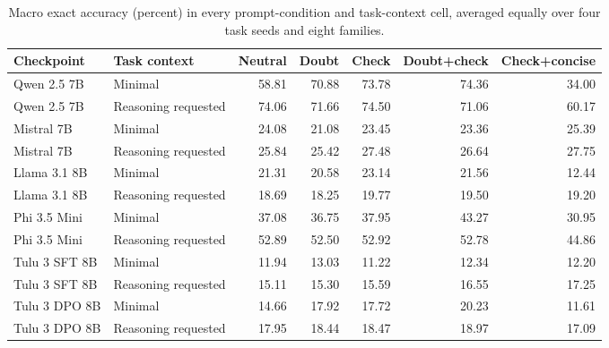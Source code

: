 \begin{table}[t]
\centering\scriptsize
\caption{Macro exact accuracy (percent) in every prompt-condition and task-context cell, averaged equally over four task seeds and eight families.}
\label{tab:condition-accuracy}
\begin{tabular}{@{}llrrrrr@{}}
\toprule
Checkpoint & Task context & Neutral & Doubt & Check & Doubt+check & Check+concise \\
\midrule
Qwen 2.5 7B & Minimal & 58.81 & 70.88 & 73.78 & 74.36 & 34.00 \\
Qwen 2.5 7B & Reasoning requested & 74.06 & 71.66 & 74.50 & 71.06 & 60.17 \\
\addlinespace[1.5pt]
Mistral 7B & Minimal & 24.08 & 21.08 & 23.45 & 23.36 & 25.39 \\
Mistral 7B & Reasoning requested & 25.84 & 25.42 & 27.48 & 26.64 & 27.75 \\
\addlinespace[1.5pt]
Llama 3.1 8B & Minimal & 21.31 & 20.58 & 23.14 & 21.56 & 12.44 \\
Llama 3.1 8B & Reasoning requested & 18.69 & 18.25 & 19.77 & 19.50 & 19.20 \\
\addlinespace[1.5pt]
Phi 3.5 Mini & Minimal & 37.08 & 36.75 & 37.95 & 43.27 & 30.95 \\
Phi 3.5 Mini & Reasoning requested & 52.89 & 52.50 & 52.92 & 52.78 & 44.86 \\
\addlinespace[1.5pt]
Tulu 3 SFT 8B & Minimal & 11.94 & 13.03 & 11.22 & 12.34 & 12.20 \\
Tulu 3 SFT 8B & Reasoning requested & 15.11 & 15.30 & 15.59 & 16.55 & 17.25 \\
\addlinespace[1.5pt]
Tulu 3 DPO 8B & Minimal & 14.66 & 17.92 & 17.72 & 20.23 & 11.61 \\
Tulu 3 DPO 8B & Reasoning requested & 17.95 & 18.44 & 18.47 & 18.97 & 17.09 \\
\bottomrule
\end{tabular}
\end{table}
